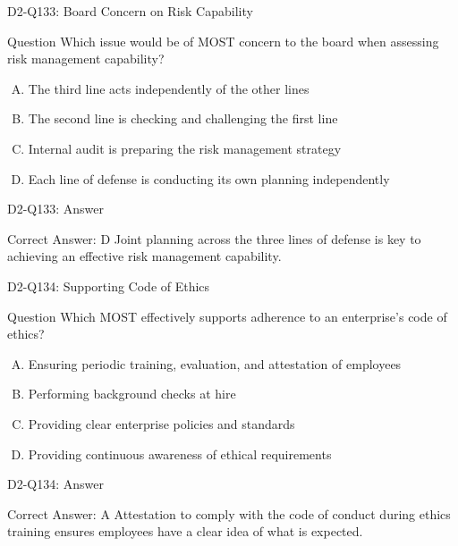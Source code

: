 \documentclass{beamer}
\begin{document}
	\begin{frame}{D2-Q133: Board Concern on Risk Capability}
		\begin{block}{Question}
			Which issue would be of MOST concern to the board when assessing risk management capability?
		\end{block}
		\begin{enumerate}[(A)]
			\item The third line acts independently of the other lines
			\item The second line is checking and challenging the first line
			\item Internal audit is preparing the risk management strategy
			\item Each line of defense is conducting its own planning independently
		\end{enumerate}
	\end{frame}
	\begin{frame}{D2-Q133: Answer}
		\begin{block}{Correct Answer: D}
			Joint planning across the three lines of defense is key to achieving an effective risk management capability.
		\end{block}
	\end{frame}
	
	\begin{frame}{D2-Q134: Supporting Code of Ethics}
		\begin{block}{Question}
			Which MOST effectively supports adherence to an enterprise's code of ethics?
		\end{block}
		\begin{enumerate}[(A)]
			\item Ensuring periodic training, evaluation, and attestation of employees
			\item Performing background checks at hire
			\item Providing clear enterprise policies and standards
			\item Providing continuous awareness of ethical requirements
		\end{enumerate}
	\end{frame}
	\begin{frame}{D2-Q134: Answer}
		\begin{block}{Correct Answer: A}
			Attestation to comply with the code of conduct during ethics training ensures employees have a clear idea of what is expected.
		\end{block}
	\end{frame}
	
\end{document}
